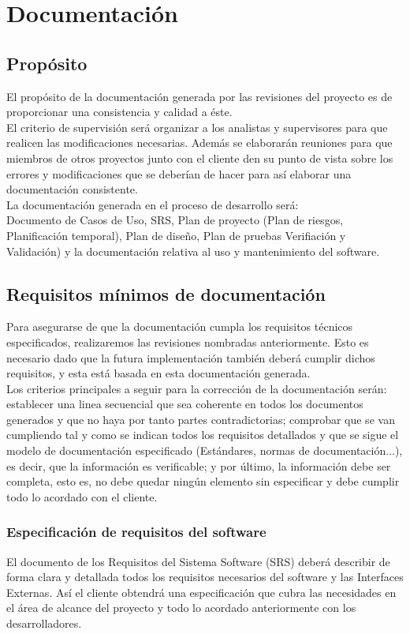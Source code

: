 \documentclass[11pt, a4paper, twoside, titlepage]{article}
\begin{document}
	\section{Documentación} %
		\subsection{Propósito} 
			El propósito de la documentación generada por las revisiones del proyecto es de proporcionar una consistencia y 
			calidad a éste. \\
			El criterio de supervisión será organizar a los analistas y supervisores para que realicen las modificaciones 
			necesarias. Además se elaborarán reuniones para que miembros de otros proyectos junto con el cliente den su punto
			de vista sobre los errores y modificaciones que se deberían de hacer para así elaborar una documentación consistente.\\
			La documentación generada en el proceso de desarrollo será: \\
			Documento de Casos de Uso, SRS, Plan de proyecto (Plan de riesgos, Planificación temporal), Plan de diseño, Plan de pruebas 
			Verifiación y Validación) y la documentación relativa al uso y mantenimiento del software.
			
		\subsection{Requisitos mínimos de documentación} 
			Para asegurarse de que la documentación cumpla los requisitos técnicos especificados, realizaremos las revisiones nombradas
			anteriormente. Esto es necesario dado que la futura implementación también deberá cumplir dichos requisitos, y esta está basada
			en esta documentación generada.\\
			Los criterios principales a seguir para la corrección de la documentación serán: establecer una linea secuencial que sea
			coherente en todos los documentos generados y que no haya por tanto partes contradictorias; comprobar que se van cumpliendo tal
			y como se indican todos los requisitos detallados y que se sigue el modelo de documentación especificado (Estándares, normas de
			documentación...), es decir, que la información es verificable; y por último, la información debe ser completa, esto es, no
			debe quedar ningún elemento sin especificar y debe cumplir todo lo acordado con el cliente.
			
				\subsubsection{Especificación de requisitos del software}
					El documento de los Requisitos del Sistema Software (SRS) deberá describir de forma clara y detallada todos los requisitos
					necesarios del software y las Interfaces Externas. Así el cliente obtendrá una especificación que cubra las necesidades en
					el área de alcance del proyecto y todo lo acordado anteriormente con los desarrolladores.
		
\end{document}
